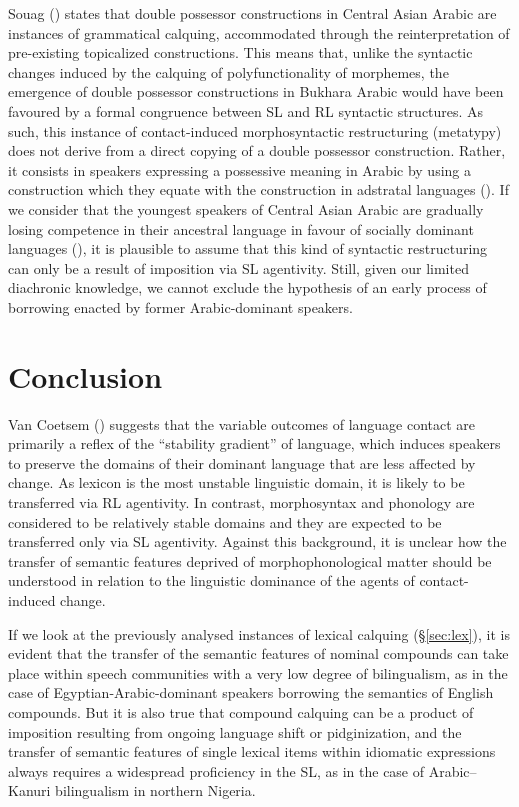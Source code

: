 \documentclass[output=paper]{langsci/langscibook}
\begin{document}
Souag (\citeyear[157]{Souag2017clitic}) states that double possessor constructions in Central Asian Arabic are instances of grammatical calquing, accommodated through the reinterpretation of pre-existing topicalized constructions. This means that, unlike the syntactic changes induced by the calquing of polyfunctionality of morphemes, the emergence of double possessor constructions in Bukhara Arabic would have been favoured by a formal congruence between SL and RL syntactic structures. As such, this instance of contact-induced morphosyntactic restructuring (metatypy) does not derive from a direct copying of a double possessor construction. Rather, it consists in speakers expressing a possessive meaning in Arabic by using a construction which they equate with the construction in adstratal languages (\citealt[128]{Ross2007}). If we consider that the youngest speakers of Central Asian Arabic are gradually losing competence in their ancestral language in favour of socially dominant languages (\citealt[128]{Chikovani2005}), it is plausible to assume that this kind of syntactic restructuring can only be a result of imposition via SL agentivity. Still, given our limited diachronic knowledge, we cannot exclude the hypothesis of an early process of borrowing enacted by former Arabic-dominant speakers.   

\section{Conclusion}

Van Coetsem (\citeyear[20]{VanCoetsem1988}) suggests that the variable outcomes of language contact are primarily a reflex of the ``stability gradient'' of language, which induces speakers to preserve the domains of their dominant language that are less affected by change. As lexicon is the most unstable linguistic domain, it is likely to be transferred via RL agentivity. In contrast, morphosyntax and phonology are considered to be relatively stable domains and they are expected to be transferred only via SL agentivity. Against this background, it is unclear how the transfer of semantic features deprived of morphophonological matter should be understood in relation to the linguistic dominance of the agents of contact-induced change. 

If we look at the previously analysed instances of lexical calquing (§\ref{sec:lex}), it is evident that the transfer of the semantic features of nominal compounds can take place within speech communities with a very low degree of bilingualism, as in the case of Egyptian-Arabic-dominant speakers borrowing the semantics of English compounds. But it is also true that compound calquing can be a product of imposition resulting from ongoing language shift or pidginization, and the transfer of semantic features of single lexical items within idiomatic expressions always requires a widespread proficiency in the SL, as in the case of Arabic–Kanuri bilingualism in northern Nigeria. 
\end{document}
